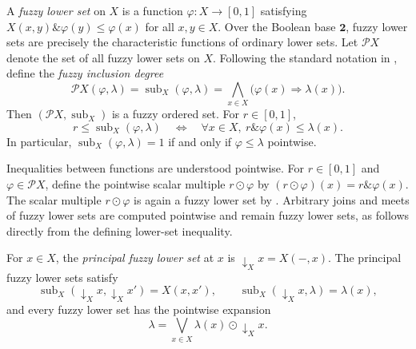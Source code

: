 \documentclass[preprint,3p,times]{elsarticle}
\theoremstyle{definition}
\theoremstyle{remark}
\newcommand{\Psh}{\mathcal{P}}
\newcommand{\subdeg}{\operatorname{sub}}
\newcommand{\tn}{\mathbin{\&}}
\numberwithin{equation}{section}
\begin{document}
A \emph{fuzzy lower set} on \(X\) is a function \(\varphi\colon X\to[0,1]\) satisfying
\(
 X(x,y)\tn\varphi(y)\leq\varphi(x)
\) for all \(x,y\in X\).
Over the Boolean base \(\mathbf2\), fuzzy lower sets are precisely the characteristic functions of ordinary lower sets. 
Let \(\Psh X\) denote the set of all fuzzy lower sets on \(X\). Following the standard notation in  \cite[Section~2]{LaiZhangZhang2020}, define the \emph{fuzzy inclusion degree}
\begin{equation}\label{eq:weight-hom}
 \Psh X(\varphi,\lambda)=\subdeg_X(\varphi,\lambda)
 =\bigwedge_{x\in X}\bigl(\varphi(x)\Rightarrow\lambda(x)\bigr).
\end{equation}
Then \((\Psh X,\subdeg_X)\) is a fuzzy ordered set. For \(r\in[0,1]\),
\begin{equation}\label{eq:bracket-test}
 r\leq\subdeg_X(\varphi,\lambda)
 \quad\Longleftrightarrow\quad \forall x\in X, \
 r\tn\varphi(x)\leq\lambda(x).
\end{equation}
In particular, \(\subdeg_X(\varphi,\lambda)=1\) if and only if \(\varphi\leq\lambda\) pointwise.

Inequalities between functions are understood pointwise. For \(r\in[0,1]\) and \(\varphi\in\Psh X\), define the pointwise scalar multiple \(r\odot\varphi\) by
\(
 (r\odot\varphi)(x)=r\tn\varphi(x).
\)
The scalar multiple \(r\odot\varphi\) is again a fuzzy lower set by \cite[Lemma~2.8]{LaiZhangZhang2020}. Arbitrary joins and meets of fuzzy lower sets are computed pointwise and remain fuzzy lower sets, as follows directly from the defining lower-set inequality. 

For \(x\in X\), the \emph{principal fuzzy lower set} at \(x\) is
\(
 \downarrow_X x=X(-,x).
\)
The principal fuzzy lower sets satisfy 
\begin{equation}\label{eq:yoneda-identities}
 \subdeg_X(\downarrow_X x,\downarrow_X x')=X(x,x'),
 \qquad
 \subdeg_X(\downarrow_X x,\lambda)=\lambda(x),
\end{equation}
and every fuzzy lower set has the pointwise expansion \cite[Corollary~7.11 and Proposition~6.19]{Zhang2024}
\begin{equation}\label{eq:lower-set-expansion}
 \lambda=\bigvee_{x\in X}\lambda(x)\odot\downarrow_X x.
\end{equation}

\end{document}
